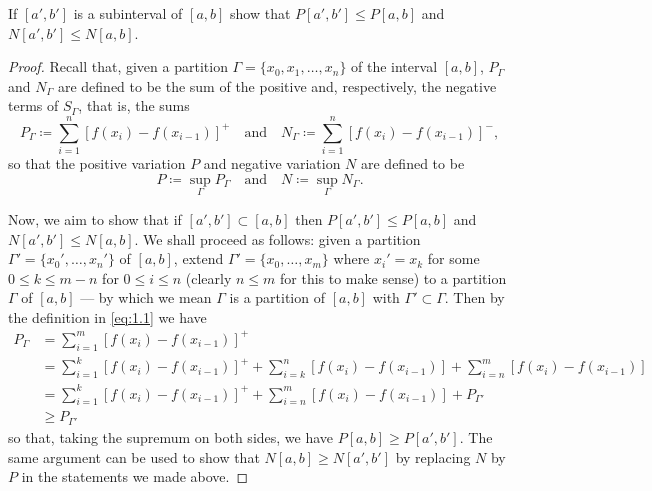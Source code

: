\begin{problem}
  If $[a',b']$ is a subinterval of $[a,b]$ show that $P[a',b']\leq P[a,b]$
  and $N[a',b']\leq N[a,b]$.
\end{problem}
\begin{proof}
  Recall that, given a partition $\Gamma=\{x_0,x_1,\ldots,x_n\}$ of the
  interval $[a,b]$, $P_\Gamma$ and $N_\Gamma$ are defined to be the sum of
  the positive and, respectively, the negative terms of $S_\Gamma$, that
  is, the sums
  \begin{equation}
    \label{eq:1.1}
    P_\Gamma\coloneq\sum_{i=1}^n\left[f(x_i)-f(x_{i-1})\right]^+
    \quad\text{and}\quad
    N_\Gamma\coloneq\sum_{i=1}^n\left[f(x_i)-f(x_{i-1})\right]^-,
  \end{equation}
  so that the positive variation $P$ and negative variation $N$ are defined
  to be
  \[
    P\coloneq\sup_\Gamma P_\Gamma \quad\text{and}\quad N\coloneq\sup_\Gamma
    N_\Gamma.
  \]

  Now, we aim to show that if $[a',b']\subset[a,b]$ then
  $P[a',b']\leq P[a,b]$ and $N[a',b']\leq N[a,b]$.  We shall proceed as
  follows: given a partition $\Gamma'=\{x_0',\ldots,x_n'\}$ of $[a,b]$,
  extend $\Gamma'=\{x_0,\ldots,x_m\}$ where $x_i'=x_k$ for some
  $0\leq k\leq m-n$ for $0\leq i\leq n$ (clearly $n\leq m$ for this to make
  sense) to a partition $\Gamma$ of $[a,b]$ --- by which we mean $\Gamma$
  is a partition of $[a,b]$ with $\Gamma'\subset\Gamma$. Then by the
  definition in \eqref{eq:1.1} we have
  \begin{align*}
    P_\Gamma
    &=\sum_{i=1}^m\left[f(x_i)-f(x_{i-1})\right]^+\\
    &=\sum_{i=1}^k\left[f(x_i)-f(x_{i-1})\right]^+
      +\sum_{i=k}^n\left[f(x_i)-f(x_{i-1})\right]
      +\sum_{i=n}^m\left[f(x_i)-f(x_{i-1})\right]\\
    &=\sum_{i=1}^k\left[f(x_i)-f(x_{i-1})\right]^+
      +\sum_{i=n}^m\left[f(x_i)-f(x_{i-1})\right]
      +P_{\Gamma'}\\
    &\geq P_{\Gamma'}
  \end{align*}
  so that, taking the supremum on both sides, we have
  $P[a,b]\geq P[a',b']$. The same argument can be used to show that
  $N[a,b]\geq N[a',b']$ by replacing $N$ by $P$ in the statements we made
  above.
\end{proof}

